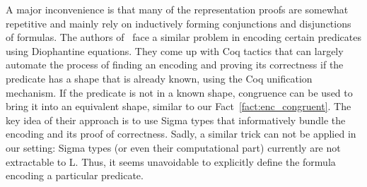 A major inconvenience is that many of the representation proofs are somewhat repetitive and mainly rely on inductively forming conjunctions and disjunctions of formulas. 
The authors of~\cite{Larchey-WendlingForster:2019:H10_in_Coq} face a similar problem in encoding certain predicates using Diophantine equations. They come up with Coq tactics that can largely automate the process of finding an encoding and proving its correctness if the predicate has a shape that is already known, using the Coq unification mechanism. If the predicate is not in a known shape, congruence can be used to bring it into an equivalent shape, similar to our Fact~\ref{fact:enc_congruent}.
The key idea of their approach is to use Sigma types that informatively bundle the encoding and its proof of correctness. 
Sadly, a similar trick can not be applied in our setting: Sigma types (or even their computational part) currently are not extractable to L. Thus, it seems unavoidable to explicitly define the formula encoding a particular predicate.

